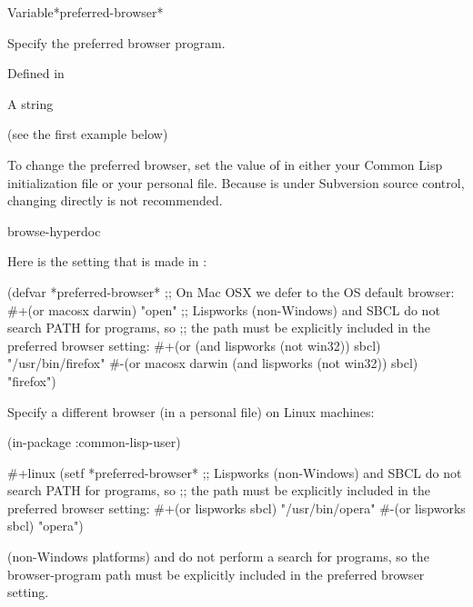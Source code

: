 \documentclass[10pt,twoside,english,pdftex]{article}
\begin{document}
\begin{functiondoc}{Variable}{*preferred-browser*}{}%

\fnsyntax

\fnpurpose Specify the preferred browser program.

\fnpackage {}

\fnmodule Defined in 

\fnvaluetype A string

\fninitialvalue (see the first example below)

\fndescription To change the preferred browser, set the value of
 in either your Common Lisp initialization
file or your personal  file.  Because
 is under Subversion source control, changing
 directly is not recommended.

\begin{alsos}{browse-hyperdoc}
\end{alsos}

\fnexamples
Here is the setting that is made in :
\begin{example}
  (defvar *preferred-browser* 
      ;; On Mac OSX we defer to the OS default browser:
      #+(or macosx darwin)
      "open"
      ;; Lispworks (non-Windows) and SBCL do not search PATH for programs, so
      ;; the path must be explicitly included in the preferred browser setting:
      #+(or (and lispworks (not win32)) sbcl) "/usr/bin/firefox"
      #-(or macosx darwin (and lispworks (not win32)) sbcl) "firefox")
\end{example}

Specify a different browser (in a personal 
file) on Linux machines:
\begin{example}
  (in-package :common-lisp-user)

  #+linux
  (setf *preferred-browser* 
    ;; Lispworks (non-Windows) and SBCL do not search PATH for programs, so
    ;; the path must be explicitly included in the preferred browser setting:
     #+(or lispworks sbcl) "/usr/bin/opera"
     #-(or lispworks sbcl) "opera")
\end{example}

\fnnote {} (non-Windows
platforms) and  do not perform a
 search for programs, so the browser-program path must be explicitly
included in the preferred browser setting.

\end{functiondoc}
\end{document}
